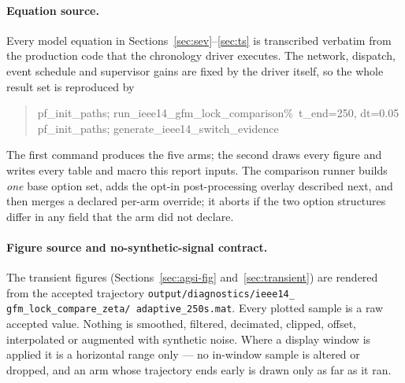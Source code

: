 \documentclass[12pt,a4paper]{article}
\theoremstyle{remark}
\begin{document}
\paragraph{Equation source.}
Every model equation in Sections~\ref{sec:sev}--\ref{sec:ts} is transcribed
verbatim from the production code that the chronology driver executes. The
network, dispatch, event schedule and supervisor gains are fixed by the driver
itself, so the whole result set is reproduced by
\begin{quote}\footnotesize\ttfamily\raggedright
pf\_init\_paths; run\_ieee14\_gfm\_lock\_comparison\quad \%\ t\_end=250, dt=0.05\\
pf\_init\_paths; generate\_ieee14\_switch\_evidence
\end{quote}
The first command produces the five arms; the second draws every figure and writes
every table and macro this report inputs. The comparison runner builds \emph{one}
base option set, adds the opt-in post-processing overlay described next, and then
merges a declared per-arm override; it aborts if the two option structures differ
in any field that the arm did not declare.

\paragraph{Figure source and no-synthetic-signal contract.}
\begin{sloppypar}
The transient figures (Sections~\ref{sec:agsi-fig} and~\ref{sec:transient}) are
rendered from the accepted trajectory
\texttt{output/\allowbreak diagnostics/\allowbreak ieee14\_\allowbreak
gfm\_\allowbreak lock\_\allowbreak compare\_\allowbreak zeta/\allowbreak
adaptive\_\allowbreak 250s.mat}. Every plotted sample is a raw accepted
value. Nothing is smoothed, filtered, decimated, clipped, offset, interpolated
or augmented with synthetic
noise. Where a display window is applied it is a horizontal range only --- no
in-window sample is altered or dropped, and an arm whose trajectory ends early is
drawn only as far as it ran.
\end{sloppypar}
\end{document}
